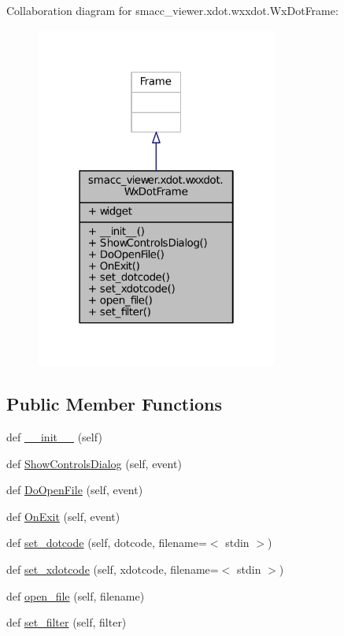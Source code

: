 Collaboration diagram for smacc\+\_\+viewer.\+xdot.\+wxxdot.\+Wx\+Dot\+Frame\+:
\nopagebreak
\begin{figure}[H]
\begin{center}
\leavevmode
\includegraphics[width=226pt]{classsmacc__viewer_1_1xdot_1_1wxxdot_1_1WxDotFrame__coll__graph}
\end{center}
\end{figure}
\subsection*{Public Member Functions}
\begin{DoxyCompactItemize}
\item 
def \hyperlink{classsmacc__viewer_1_1xdot_1_1wxxdot_1_1WxDotFrame_a03ac561b2408b4dd264d2a3201c9ce4c}{\+\_\+\+\_\+init\+\_\+\+\_\+} (self)
\item 
def \hyperlink{classsmacc__viewer_1_1xdot_1_1wxxdot_1_1WxDotFrame_a5116d653e19a10b16c0efed6aae13874}{Show\+Controls\+Dialog} (self, event)
\item 
def \hyperlink{classsmacc__viewer_1_1xdot_1_1wxxdot_1_1WxDotFrame_a133223742fb695676ea62ba29a985dbb}{Do\+Open\+File} (self, event)
\item 
def \hyperlink{classsmacc__viewer_1_1xdot_1_1wxxdot_1_1WxDotFrame_a12dd7f291407853597f902096bcf5664}{On\+Exit} (self, event)
\item 
def \hyperlink{classsmacc__viewer_1_1xdot_1_1wxxdot_1_1WxDotFrame_a6735354701679484d0821f2c31c4de61}{set\+\_\+dotcode} (self, dotcode, filename=\textquotesingle{}$<$ stdin $>$\textquotesingle{})
\item 
def \hyperlink{classsmacc__viewer_1_1xdot_1_1wxxdot_1_1WxDotFrame_a27243dae9ea562049045e4a56c4c3418}{set\+\_\+xdotcode} (self, xdotcode, filename=\textquotesingle{}$<$ stdin $>$\textquotesingle{})
\item 
def \hyperlink{classsmacc__viewer_1_1xdot_1_1wxxdot_1_1WxDotFrame_ae2b463edfd3e4156077b2dcd39d6f9b2}{open\+\_\+file} (self, filename)
\item 
def \hyperlink{classsmacc__viewer_1_1xdot_1_1wxxdot_1_1WxDotFrame_a7809317f2f774d8df31bc1b9cca167d4}{set\+\_\+filter} (self, filter)
\end{DoxyCompactItemize}
